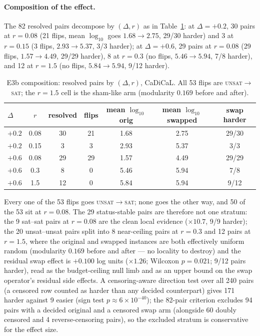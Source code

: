 \documentclass[pdflatex,sn-basic,Numbered]{sn-jnl}
\begin{document}
\paragraph{Composition of the effect.}
The 82 resolved pairs decompose by $(\Delta, r)$ as in
Table~\ref{tab:e3bcomp}: at
$\Delta{=}{+}0.2$, 30 pairs at $r{=}0.08$ (21 flips, mean $\log_{10}$
goes $1.68\to2.75$, 29/30 harder) and 3 at $r{=}0.15$ (3 flips,
$2.93\to5.37$, 3/3 harder); at $\Delta{=}{+}0.6$, 29 pairs at $r{=}0.08$
(29 flips, $1.57\to4.49$, 29/29 harder), 8 at $r{=}0.3$ (no flips,
$5.46\to5.94$, 7/8 harder), and 12 at $r{=}1.5$ (no flips,
$5.84\to5.94$, 9/12 harder).

\begin{table}[h]
\centering
\caption{E3b composition: resolved pairs by $(\Delta, r)$, CaDiCaL. All 53
flips are \textsc{unsat}$\to$\textsc{sat}; the $r{=}1.5$ cell is the
sham-like arm (modularity $0.169$ before and after).}
\begin{tabular}{lcccccc}
\toprule
$\Delta$ & $r$ & resolved & flips & mean $\log_{10}$ orig & mean $\log_{10}$ swapped & swap harder\\
\midrule
$+0.2$ & 0.08 & 30 & 21 & 1.68 & 2.75 & 29/30\\
$+0.2$ & 0.15 & 3 & 3 & 2.93 & 5.37 & 3/3\\
$+0.6$ & 0.08 & 29 & 29 & 1.57 & 4.49 & 29/29\\
$+0.6$ & 0.3 & 8 & 0 & 5.46 & 5.94 & 7/8\\
$+0.6$ & 1.5 & 12 & 0 & 5.84 & 5.94 & 9/12\\
\bottomrule
\end{tabular}
\label{tab:e3bcomp}
\end{table}

Every one of the 53 flips goes
\textsc{unsat}$\to$\textsc{sat}; none goes the other way, and 50 of the 53
sit at $r{=}0.08$. The 29 status-stable pairs are therefore not one
stratum: the 9 sat--sat pairs at $r{=}0.08$ are the clean local evidence
($\times10.7$, 9/9 harder); the 20 unsat--unsat pairs split into 8
near-ceiling pairs at $r{=}0.3$ and 12 pairs at $r{=}1.5$, where the
original and swapped instances are both effectively uniform random
(modularity $0.169$ before and after --- no locality to destroy) and the
residual swap effect is $+0.100$ log units ($\times1.26$; Wilcoxon
$p=0.021$; 9/12 pairs harder), read as the budget-ceiling null limb and as
an upper bound on the swap operator's residual side effects. A
censoring-aware direction test over all 240 pairs (a censored row counted
as harder than any decided counterpart) gives 171 harder against 9 easier
(sign test $p\approx6\times10^{-40}$); the 82-pair criterion excludes 94
pairs with a decided original and a censored swap arm (alongside 60 doubly
censored and 4 reverse-censoring pairs), so the excluded stratum is
conservative for the effect size.
\end{document}
